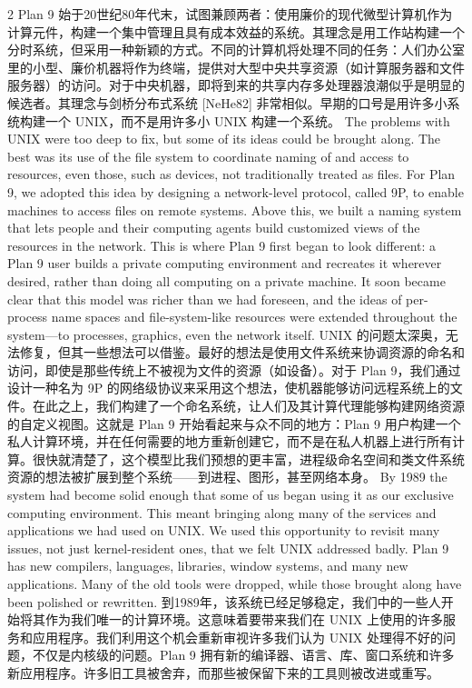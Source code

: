 \documentclass{article}
\begin{document}
\begin{paracol}{2}
Plan 9 始于20世纪80年代末，试图兼顾两者：使用廉价的现代微型计算机作为计算元件，构建一个集中管理且具有成本效益的系统。其理念是用工作站构建一个分时系统，但采用一种新颖的方式。不同的计算机将处理不同的任务：人们办公室里的小型、廉价机器将作为终端，提供对大型中央共享资源（如计算服务器和文件服务器）的访问。对于中央机器，即将到来的共享内存多处理器浪潮似乎是明显的候选者。其理念与剑桥分布式系统 [NeHe82] 非常相似。早期的口号是用许多小系统构建一个 UNIX，而不是用许多小 UNIX 构建一个系统。
\switchcolumn*
The problems with UNIX were too deep to fix, but some of its ideas could be brought along. The best was its use of the file system to coordinate naming of and access to resources, even those, such as devices, not traditionally treated as files. For Plan 9, we adopted this idea by designing a network-level protocol, called 9P, to enable machines to access files on remote systems. Above this, we built a naming system that lets people and their computing agents build customized views of the resources in the network. This is where Plan 9 first began to look different: a Plan 9 user builds a private computing environment and recreates it wherever desired, rather than doing all computing on a private machine. It soon became clear that this model was richer than we had foreseen, and the ideas of per-process name spaces and file-system-like resources were extended throughout the system—to processes, graphics, even the network itself.
\switchcolumn
UNIX 的问题太深奥，无法修复，但其一些想法可以借鉴。最好的想法是使用文件系统来协调资源的命名和访问，即使是那些传统上不被视为文件的资源（如设备）。对于 Plan 9，我们通过设计一种名为 9P 的网络级协议来采用这个想法，使机器能够访问远程系统上的文件。在此之上，我们构建了一个命名系统，让人们及其计算代理能够构建网络资源的自定义视图。这就是 Plan 9 开始看起来与众不同的地方：Plan 9 用户构建一个私人计算环境，并在任何需要的地方重新创建它，而不是在私人机器上进行所有计算。很快就清楚了，这个模型比我们预想的更丰富，进程级命名空间和类文件系统资源的想法被扩展到整个系统——到进程、图形，甚至网络本身。
\switchcolumn*
By 1989 the system had become solid enough that some of us began using it as our exclusive computing environment. This meant bringing along many of the services and applications we had used on UNIX. We used this opportunity to revisit many issues, not just kernel-resident ones, that we felt UNIX addressed badly. Plan 9 has new compilers, languages, libraries, window systems, and many new applications. Many of the old tools were dropped, while those brought along have been polished or rewritten.
\switchcolumn
到1989年，该系统已经足够稳定，我们中的一些人开始将其作为我们唯一的计算环境。这意味着要带来我们在 UNIX 上使用的许多服务和应用程序。我们利用这个机会重新审视许多我们认为 UNIX 处理得不好的问题，不仅是内核级的问题。Plan 9 拥有新的编译器、语言、库、窗口系统和许多新应用程序。许多旧工具被舍弃，而那些被保留下来的工具则被改进或重写。

\end{paracol}
\end{document}
